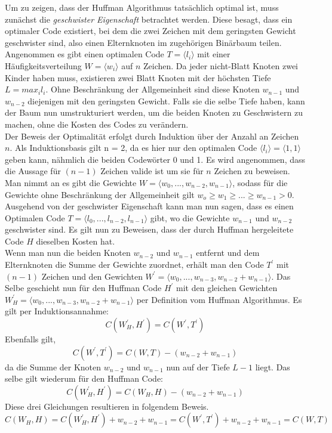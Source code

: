 \documentclass[course=erap]{aspdoc}
\begin{document}
Um zu zeigen, dass der Huffman Algorithmus tatsächlich optimal ist, muss zunächst die \textit{geschwister Eigenschaft} betrachtet werden.
Diese besagt, dass ein optimaler Code existiert, bei dem die zwei Zeichen mit dem geringsten Gewicht geschwister sind, also einen Elternknoten im zugehörigen Binärbaum teilen.\\
Angenommen es gibt einen optimalen Code $T = \langle l_i \rangle $ mit einer Häufigkeitsverteilung $W = \langle w_i \rangle $ auf $n$ Zeichen.
Da jeder nicht-Blatt Knoten zwei Kinder haben muss, existieren zwei Blatt Knoten mit der höchsten Tiefe $ L = max_i l_i$. Ohne Beschränkung der Allgemeinheit sind diese Knoten $w_{n-1}$ und $w_{n-2}$ diejenigen mit den geringsten Gewicht. Falls sie die selbe Tiefe haben, kann der Baum nun umstrukturiert werden, um die beiden Knoten zu Geschwistern zu machen, ohne die Kosten des Codes zu verändern.\\
Der Beweis der Optimalität erfolgt durch Induktion über der Anzahl an Zeichen $n$. \cite{HufProof}
Als Induktionsbasis gilt n = 2, da es hier nur den optimalen Code $ \langle l_i \rangle = \langle 1, 1 \rangle $ geben kann, nähmlich die beiden Codewörter 0 und 1.
Es wird angenommen, dass die Aussage für $(n-1)$ Zeichen valide ist um sie für $n$ Zeichen zu beweisen.
Man nimmt an es gibt die Gewichte $W = \langle w_0,..., w_{n-2}, w_{n-1} \rangle $, sodass für die Gewichte ohne Beschränkung der Allgemeinheit gilt $w_o \ge w_1 \ge ... \ge w_{n-1} > 0$.\\
Ausgehend von der geschwister Eigenschaft kann man nun sagen, dass es einen Optimalen Code $T = \langle l_0,..., l_{n-2}, l_{n-1} \rangle$ gibt, wo die Gewichte $w_{n-1}$ und $w_{n-2}$ geschwister sind. Es gilt nun zu Beweisen, dass der durch Huffman hergeleitete Code $H$ dieselben Kosten hat.\\
Wenn man nun die beiden Knoten $w_{n-2}$ und $w_{n-1}$ entfernt und dem Elternknoten die Summe der Gewichte zuordnet, erhält man den Code $T^{\prime}$ mit $(n-1)$ Zeichen und den Gewichten $W^{\prime} = \langle w_0,..., w_{n-3}, w_{n-2} + w_{n-1} \rangle$.
Das Selbe geschieht nun für den Huffman Code $H^{\prime}$ mit den gleichen Gewichten $W_H^{\prime} = \langle w_0,..., w_{n-3}, w_{n-2} + w_{n-1} \rangle $ per Definition vom Huffman Algorithmus.
Es gilt per Induktionsannahme:
$$C(W_H^{\prime}, H^{\prime}) = C(W^\prime, T^{\prime})$$
Ebenfalls gilt,
$$ C(W^\prime, T^{\prime}) = C(W, T) - (w_{n-2} + w_{n-1})$$
da die Summe der Knoten $w_{n-2}$ und $w_{n-1}$ nun auf der Tiefe $L-1$ liegt.
Das selbe gilt wiederum für den Huffman Code:
$$ C(W_H^\prime, H^{\prime}) = C(W_H, H) - (w_{n-2} + w_{n-1})$$
Diese drei Gleichungen resultieren in folgendem Beweis.
$$ C(W_H, H) = C(W_H^\prime, H^{\prime}) + w_{n-2} + w_{n-1} = C(W^\prime, T^{\prime}) + w_{n-2} + w_{n-1} = C(W, T) $$
\end{document}
